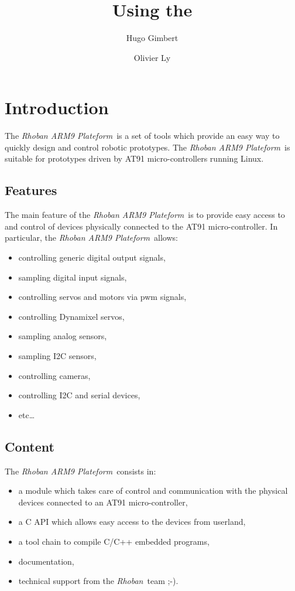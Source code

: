 \documentclass[a4paper]{article}
\title{Using the \rhobanp}
\author{Hugo Gimbert \and Olivier Ly}
\newcommand{\rhoban}{\emph{Rhoban}\ }
\newcommand{\rhobanp}{\emph{Rhoban ARM9 Plateform}\ }
\begin{document}
\maketitle

\section{Introduction}

The \rhobanp is a set of tools which provide an easy way to
quickly design and control robotic prototypes.
The \rhobanp is suitable for prototypes driven by AT91
micro-controllers running Linux.

\subsection{Features}

The main feature of the \rhobanp is to
provide easy access to and control of devices physically connected to the
AT91 micro-controller. In particular, the \rhobanp allows:
\begin{itemize}
  \item controlling generic digital output signals,
  \item sampling digital input signals,
  \item controlling servos and motors via pwm signals,
  \item controlling Dynamixel servos,
  \item sampling analog sensors,
  \item sampling I2C sensors,
  \item controlling cameras,
  \item controlling I2C and serial devices,
  \item etc\ldots
\end{itemize}

\subsection{Content}

The \rhobanp consists in:
\begin{itemize}
  \item a module which takes care of control and communication with
  the physical devices connected to an AT91 micro-controller,
   \item a C API which allows easy access to the devices from userland,
   \item a tool chain to compile C/C++ embedded programs,
   \item documentation,
   \item technical support from the \rhoban team ;-).
\end{itemize}
\end{document}
